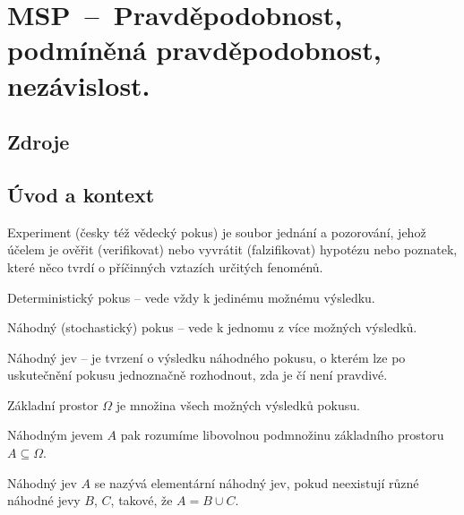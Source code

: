 

\graphicspath{{msp/pravdepodobnost/figures}}


\chapter{MSP~--~Pravděpodobnost, podmíněná pravděpodobnost, nezávislost.}


\section{Zdroje}

\begin{compactitem}
    \item {}
    \item {}
\end{compactitem}


\section{Úvod a kontext}

\begin{compactitem}
    \item Experiment (česky též vědecký pokus) je soubor jednání a pozorování, jehož účelem je ověřit (verifikovat) nebo vyvrátit (falzifikovat) hypotézu nebo poznatek, které něco tvrdí o příčinných vztazích určitých fenoménů.

    \item Deterministický pokus -- vede vždy k jedinému možnému výsledku.

    \item Náhodný (stochastický) pokus -- vede k jednomu z více možných výsledků.

    \item Náhodný jev -- je tvrzení o výsledku náhodného pokusu, o kterém lze po uskutečnění pokusu jednoznačně rozhodnout, zda je čí není pravdivé.

    \item Základní prostor $\Omega$ je množina všech možných výsledků pokusu.

    \item Náhodným jevem $A$ pak rozumíme libovolnou podmnožinu základního prostoru $A \subseteq \Omega$.

    \item Náhodný jev $A$ se nazývá elementární náhodný jev, pokud neexistují různé náhodné jevy $B$, $C$, takové, že $A = B \cup C$.

\end{compactitem}


